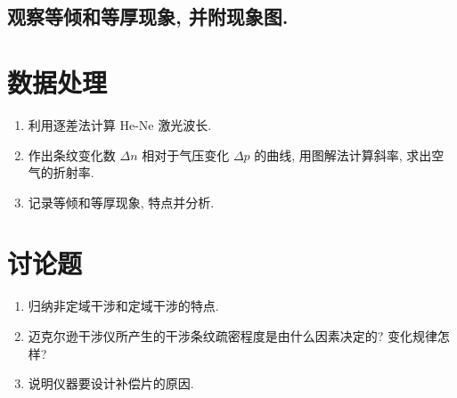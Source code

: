 \documentclass[signature=data]{physicsreport}
\begin{document}
\subsection{观察等倾和等厚现象, 并附现象图.}

\makeatletter
{}
\makeatother

\newpage
\section{数据处理}
\begin{enumerate}
    \item 利用逐差法计算 He-Ne 激光波长.
    \item 作出条纹变化数 $\Delta n$ 相对于气压变化 $\Delta p$ 的曲线, 用图解法计算斜率, 求出空气的折射率.
    \item 记录等倾和等厚现象, 特点并分析.
\end{enumerate}

\newpage
\section{讨论题}
\begin{enumerate}
    \item 归纳非定域干涉和定域干涉的特点.
    \item 迈克尔逊干涉仪所产生的干涉条纹疏密程度是由什么因素决定的? 变化规律怎样?
    \item 说明仪器要设计补偿片的原因.
\end{enumerate}
\end{document}
